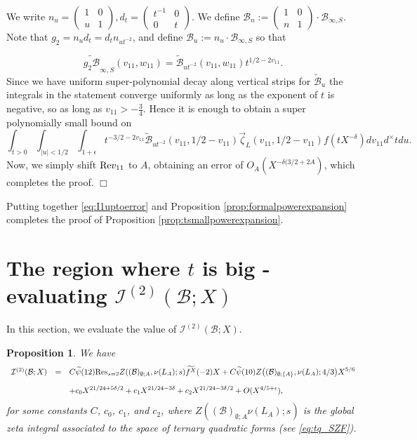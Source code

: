 \documentclass{article}
\def\Res{{\rm Res}}
\def\Re{{\rm Re}}
\def\cB{{\mathcal B}}
\def\I{{\mathcal I}}
\def\wt{\widetilde}
\newtheorem{proposition}[theorem]{Proposition}
\newenvironment{proof}{\noindent {\bf Proof:}}{$\Box$ \vspace{2 ex}}
\begin{document}
\begin{proof}
We write $n_u=\left(\begin{smallmatrix}
    1 & 0\\u & 1
\end{smallmatrix}\right), d_t=\left(\begin{smallmatrix}
    t^{-1} & 0\\0 & t
\end{smallmatrix}\right)$. We define $\cB_n:=\left(\begin{smallmatrix}
    1 & 0\\n & 1
\end{smallmatrix}\right)\cdot\cB_{\infty,S}$. Note that $g_2=n_ud_t=d_tn_{ut^{-2}}$, and define $\cB_u:=n_u\cdot\cB_{\infty,S}$ so that 

$$\wt{g_2\cB}_{\infty,S}(v_{11},w_{11}) =\wt{\cB}_{ut^{-2}}(v_{11},w_{11})t^{1/2-2v_{11}}.$$
 Since we have uniform super-polynomial decay along vertical strips for $\wt{\cB}_u$ the integrals in the statement converge uniformly as long as the exponent of $t$ is negative, so as long as $v_{11}>-\frac34$. Hence it is enough to obtain a super polynomially small bound on
$$\int_{t>0}\int_{|u|<1/2}\int_{1+\epsilon}t^{-3/2-2v_{11}}\wt{\cB}_{ut^{-2}}(v_{11},1/2-v_{11})\vec{\zeta}_L(v_{11},1/2-v_{11})f(tX^{-\delta})dv_{11}d^\times tdu.$$
Now, we simply shift  $\Re v_{11}$ to $A$, obtaining an error of $O_A(X^{-\delta(3/2+2A})$, which completes the proof. 
\end{proof}

Putting together \eqref{eq:I1uptoerror} and Proposition \ref{prop:formalpowerexpansion} completes the proof of Proposition \ref{prop:tsmallpowerexpansion}.




\section{The region where $t$ is big - evaluating $\I^{(2)}(\cB;X)$}
In this section, we evaluate the value of $\I^{(2)}(\cB;X)$.

\begin{proposition}\label{prop:section6_t_big_main}
We have
\begin{equation*}
\begin{array}{rcl}
\I^{(2)}(\cB;X)&=&
\displaystyle C\wt{\psi}(12)\Res_{s=2}Z((\cB)_{\emptyset;{A}},\nu(L_A);s)\wt{f^X}(-2)X+C\wt{\psi}(10)Z\bigl((\cB)_{\emptyset;\{A\}},\nu(L_A);4/3\bigr)X^{5/6}
\\[.15in]&&\displaystyle
+c_0X^{21/24+5\delta/2}+c_1X^{21/24-3\delta}+c_2X^{21/24-3\delta/2}+O(X^{4/5+\epsilon}),
\end{array}
\end{equation*}
for some constants $C$, $c_0$, $c_1$, and $c_2$, where $Z((\cB)_{\emptyset;{A}}\nu(L_A);s)$ is the global zeta integral associated to the space of ternary quadratic forms (see \eqref{eq:tq_SZF}).
\end{proposition} 
\end{document}
